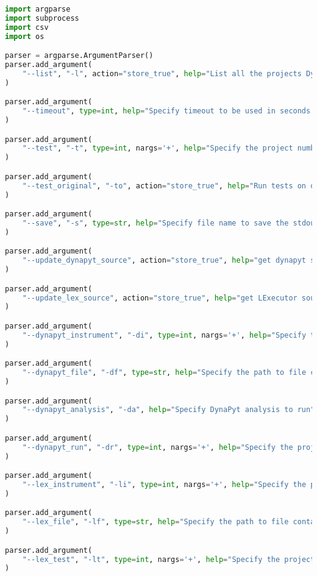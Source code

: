 \lstset{numbers=left, numberstyle=\tiny, stepnumber=1, numbersep=5pt, columns=flexible, breaklines=true, numberblanklines=false}
\lstset{basicstyle=\ttfamily}
\lstset{frame=tb}
\begin{lstlisting}[caption=Access Interface of DyPyBench,label=code:dypybench.py,language=Python]
import argparse
import subprocess
import csv
import os

parser = argparse.ArgumentParser()
parser.add_argument(
    "--list", "-l", action="store_true", help="List all the projects DyPyBench supports"
)

parser.add_argument(
    "--timeout", type=int, help="Specify timeout to be used in seconds for execution of subprocesses", default=(60*10)
)

parser.add_argument(
    "--test", "-t", type=int, nargs='+', help="Specify the project number to run the test suite"
)

parser.add_argument(
    "--test_original", "-to", action="store_true", help="Run tests on original code"
)

parser.add_argument(
    "--save", "-s", type=str, help="Specify file name to save the stdout and stderr combined"
)

parser.add_argument(
    "--update_dynapyt_source", action="store_true", help="get dynapyt source code"
)

parser.add_argument(
    "--update_lex_source", action="store_true", help="get LExecutor source code"
)

parser.add_argument(
    "--dynapyt_instrument", "-di", type=int, nargs='+', help="Specify the project no. to run DynaPyt instrumentation"
)

parser.add_argument(
    "--dynapyt_file", "-df", type=str, help="Specify the path to file containing the includes.txt file to run the instrumentation"
)

parser.add_argument(
    "--dynapyt_analysis", "-da", help="Specify DynaPyt analysis to run"
)

parser.add_argument(
    "--dynapyt_run", "-dr", type=int, nargs='+', help="Specify the project no. to run DynaPyt Analysis"
)

parser.add_argument(
    "--lex_instrument", "-li", type=int, nargs='+', help="Specify the project no. to run LExecutor instrumentation"
)

parser.add_argument(
    "--lex_file", "-lf", type=str, help="Specify the path to file containing the includes.txt file to run the instrumentation"
)

parser.add_argument(
    "--lex_test", "-lt", type=int, nargs='+', help="Specify the project no. to run test suite for LExecutor"
)


\end{lstlisting}
